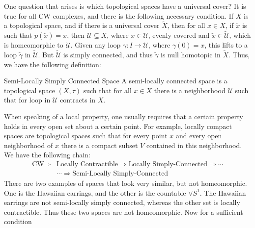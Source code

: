 \documentclass[crop=false,class=book,oneside]{standalone}
\begin{document}
        One question that arises is which topological spaces have
        a universal cover? It is true for all CW complexes, and
        there is the following necessary condition.
        If $X$ is a topological space, and if there is a
        universal cover $\tilde{X}$, then for all
        $x\in{X}$, if $\tilde{x}$ is such that
        $p(\tilde{x})=x$, then $\mathcal{U}\subseteq{X}$, where
        $x\in\mathcal{U}$, evenly covered and
        $\tilde{x}\in\tilde{\mathcal{U}}$, which is homeomorphic
        to $\mathcal{U}$. Given any loop
        $\gamma:I\rightarrow\mathcal{U}$, where $\gamma(0)=x$,
        this lifts to a loop $\tilde{\gamma}$ in
        $\tilde{\mathcal{U}}$. But $\tilde{\mathcal{U}}$ is
        simply connected, and thus $\tilde{\gamma}$ is null
        homotopic in $\tilde{X}$. Thus, we have the following
        definition:
        \begin{ldefinition}{Semi-Locally Simply Connected Space}
            A semi-locally connected space is a topological
            space $(X,\tau)$ such that for all $x\in{X}$ there is
            a neighborhood $\mathcal{U}$ such that for loop in
            $\mathcal{U}$ contracts in $X$.
        \end{ldefinition}
        When speaking of a local property, one usually requires that
        a certain property holds in every open set about a certain
        point. For example, locally compact spaces are topological
        spaces such that for every point $x$ and every open
        neighborhood of $x$ there is a compact subset $V$ contained
        in this neighborhood. We have the following chain:
        \begin{equation}
            \begin{split}
                \textrm{CW}\Longrightarrow
                &\textrm{Locally Contractible}\Longrightarrow
                \textrm{Locally Simply-Connected}
                \Longrightarrow\cdots\\
                &\cdots\Longrightarrow
                \textrm{Semi-Locally Simply-Connected}
            \end{split}
        \end{equation}
        There are two examples of spaces that look very similar,
        but not homeomorphic. One is the Hawaiian earrings, and
        the other is the countable $\lor{S}^{1}$. The Hawaiian
        earrings are not semi-locally simply connected, whereas
        the other set is locally contractible. Thus these two
        spaces are not homeomorphic. Now for a sufficient condition
\end{document}
